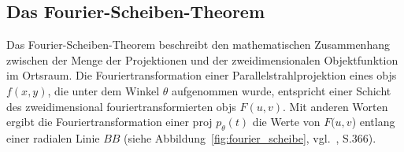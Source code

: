 \subsection{Das Fourier-Scheiben-Theorem}\label{ssec:fourier_scheibe}

Das Fourier-Scheiben-Theorem beschreibt den mathematischen Zusammenhang zwischen der Menge der Projektionen und der
zweidimensionalen Objektfunktion im Ortsraum. Die Fouriertransformation einer Parallelstrahlprojektion eines
\gls{obj}s $f(x, y)$, die unter dem Winkel $\theta$ aufgenommen wurde, entspricht einer Schicht des zweidimensional
fouriertransformierten \gls{obj}s $F(u, v)$.
Mit anderen Worten ergibt die Fouriertransformation einer \gls{proj} $p_{\theta}(t)$ die Werte von $F(u, v$) entlang
einer radialen Linie $BB$ (siehe Abbildung~\ref{fig:fourier_scheibe}, vgl.~\cite{rosenkak}, S.366). 

